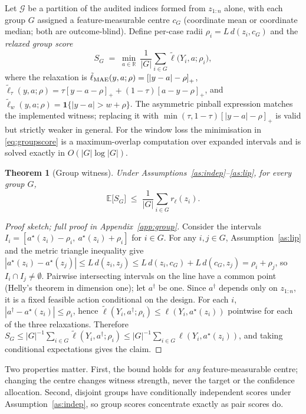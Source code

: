 \documentclass[11pt]{article}
\newtheorem{theorem}{Theorem}
\theoremstyle{definition}
\newcommand{\E}{\mathbb{E}}
\newcommand{\ind}{\mathbf{1}}
\newcommand{\clip}[1]{\left[#1\right]_+}
\begin{document}
Let $\mathcal{G}$ be a partition of the audited indices formed from $z_{1:n}$ alone, with each group $G$ assigned a feature-measurable centre $c_G$ (coordinate mean or coordinate median; both are outcome-blind). Define per-case radii $\rho_i=L\,d(z_i,c_G)$ and the \emph{relaxed group score}
\begin{equation}
S_G \;=\; \min_{a\in\mathbb{R}}\ \frac{1}{|G|}\sum_{i\in G}\tilde\ell\big(Y_i,a;\rho_i\big),
\label{eq:groupscore}
\end{equation}
where the relaxation is $\tilde\ell_{\rm MAE}(y,a;\rho)=\clip{|y-a|-\rho}$,
$\tilde\ell_\tau(y,a;\rho)=\tau\clip{y-a-\rho}+(1-\tau)\clip{a-y-\rho}$, and
$\tilde\ell_w(y,a;\rho)=\ind\{|y-a|>w+\rho\}$. The asymmetric pinball expression matches the implemented witness; replacing it with $\min(\tau,1-\tau)\clip{|y-a|-\rho}$ is valid but strictly weaker in general. For the window loss the minimisation in \eqref{eq:groupscore} is a maximum-overlap computation over expanded intervals and is solved exactly in $O(|G|\log|G|)$.

\begin{theorem}[Group witness]\label{thm:group}
Under Assumptions~\ref{as:indep}--\ref{as:lip}, for every group $G$,
\[
\E\big[S_G\big]\;\le\;\frac{1}{|G|}\sum_{i\in G} r_\ell(z_i).
\]
\end{theorem}

\begin{proof}[Proof sketch; full proof in Appendix~\ref{app:group}]
Consider the intervals $I_i=[a^\star(z_i)-\rho_i,\ a^\star(z_i)+\rho_i]$ for $i\in G$. For any $i,j\in G$, Assumption~\ref{as:lip} and the metric triangle inequality give
$|a^\star(z_i)-a^\star(z_j)|\le L\,d(z_i,z_j)\le L\,d(z_i,c_G)+L\,d(c_G,z_j)=\rho_i+\rho_j$,
so $I_i\cap I_j\ne\emptyset$. Pairwise intersecting intervals on the line have a common point (Helly's theorem in dimension one); let $a^\dagger$ be one. Since $a^\dagger$ depends only on $z_{1:n}$, it is a fixed feasible action conditional on the design. For each $i$, $|a^\dagger-a^\star(z_i)|\le\rho_i$, hence $\tilde\ell(Y_i,a^\dagger;\rho_i)\le\ell(Y_i,a^\star(z_i))$ pointwise for each of the three relaxations. Therefore
$S_G\le |G|^{-1}\sum_{i\in G}\tilde\ell(Y_i,a^\dagger;\rho_i)\le |G|^{-1}\sum_{i\in G}\ell(Y_i,a^\star(z_i))$,
and taking conditional expectations gives the claim.
\end{proof}

Two properties matter. First, the bound holds for \emph{any} feature-measurable centre; changing the centre changes witness strength, never the target or the confidence allocation. Second, disjoint groups have conditionally independent scores under Assumption~\ref{as:indep}, so group scores concentrate exactly as pair scores do.
\end{document}
